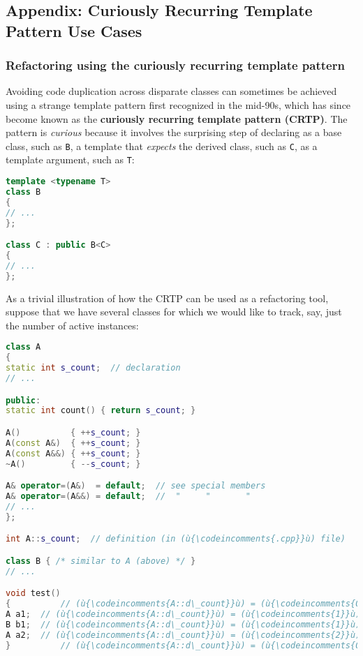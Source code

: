 \subsection[Appendix: Curiously Recurring Template Pattern Use Cases]{Appendix: Curiously Recurring Template Pattern Use Cases}\label{appendix:-crtp-use-cases}

\subsubsection[Refactoring using the curiously recurring template pattern]{Refactoring using the curiously recurring template pattern}\label{refactoring-using-the-curiously-recurring-template-pattern}

Avoiding code duplication across disparate classes can sometimes be
achieved using a strange template pattern first recognized in the
mid-90s, which has since become known as the \textbf{curiously recurring
template pattern (CRTP)}. The pattern is \emph{curious} because it
involves the surprising step of declaring as a base class, such as
\texttt{B}, a template that \emph{expects} the derived class, such as
\texttt{C}, as a template argument, such as \texttt{T}:

\begin{lstlisting}[language=C++]
template <typename T>
class B
{
// ...
};

class C : public B<C>
{
// ...
};
\end{lstlisting}

\noindent As a trivial illustration of how the CRTP can be used as a refactoring tool,
suppose that we have several classes for which we would like to track,
say, just the number of active instances:

\begin{lstlisting}[language=C++]
class A
{
static int s_count;  // declaration
// ...

public:
static int count() { return s_count; }

A()          { ++s_count; }
A(const A&)  { ++s_count; }
A(const A&&) { ++s_count; }
~A()         { --s_count; }

A& operator=(A&)  = default;  // see special members
A& operator=(A&&) = default;  //  "     "       "
// ...
};

int A::s_count;  // definition (in (ù{\codeincomments{.cpp}}ù) file)

class B { /* similar to A (above) */ }
// ...

void test()
{          // (ù{\codeincomments{A::d\_count}}ù) = (ù{\codeincomments{0}}ù), (ù{\codeincomments{B::d\_count}}ù) = (ù{\codeincomments{0}}ù)
A a1;  // (ù{\codeincomments{A::d\_count}}ù) = (ù{\codeincomments{1}}ù), (ù{\codeincomments{B::d\_count}}ù) = (ù{\codeincomments{0}}ù)
B b1;  // (ù{\codeincomments{A::d\_count}}ù) = (ù{\codeincomments{1}}ù), (ù{\codeincomments{B::d\_count}}ù) = (ù{\codeincomments{1}}ù)
A a2;  // (ù{\codeincomments{A::d\_count}}ù) = (ù{\codeincomments{2}}ù), (ù{\codeincomments{B::d\_count}}ù) = (ù{\codeincomments{1}}ù)
}          // (ù{\codeincomments{A::d\_count}}ù) = (ù{\codeincomments{0}}ù), (ù{\codeincomments{B::d\_count}}ù) = (ù{\codeincomments{0}}ù)
\end{lstlisting}

